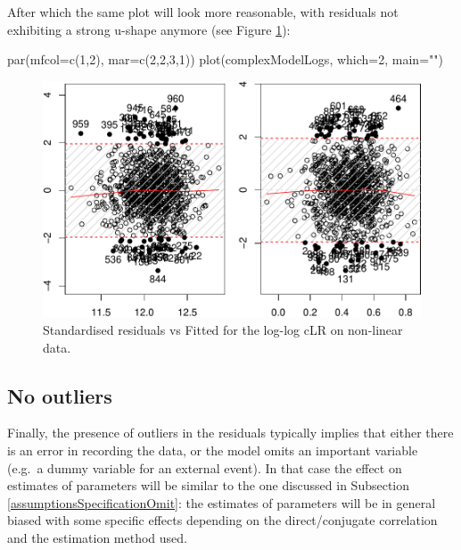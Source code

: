 \documentclass[
]{book}
\newenvironment{Shaded}{\begin{snugshade}}{\end{snugshade}}
\newcommand{\AttributeTok}[1]{\textcolor[rgb]{0.77,0.63,0.00}{#1}}
\newcommand{\DecValTok}[1]{\textcolor[rgb]{0.00,0.00,0.81}{#1}}
\newcommand{\FunctionTok}[1]{\textcolor[rgb]{0.00,0.00,0.00}{#1}}
\newcommand{\NormalTok}[1]{#1}
\newcommand{\StringTok}[1]{\textcolor[rgb]{0.31,0.60,0.02}{#1}}
\begin{document}
After which the same plot will look more reasonable, with residuals not exhibiting a strong u-shape anymore (see Figure \ref{fig:nonlinearStdResid}):

\begin{Shaded}
\begin{Highlighting}[]
\FunctionTok{par}\NormalTok{(}\AttributeTok{mfcol=}\FunctionTok{c}\NormalTok{(}\DecValTok{1}\NormalTok{,}\DecValTok{2}\NormalTok{), }\AttributeTok{mar=}\FunctionTok{c}\NormalTok{(}\DecValTok{2}\NormalTok{,}\DecValTok{2}\NormalTok{,}\DecValTok{3}\NormalTok{,}\DecValTok{1}\NormalTok{))}
\FunctionTok{plot}\NormalTok{(complexModelLogs, }\AttributeTok{which=}\DecValTok{2}\NormalTok{, }\AttributeTok{main=}\StringTok{""}\NormalTok{)}
\end{Highlighting}
\end{Shaded}

\begin{figure}
\centering
\includegraphics{Svetunkov---Svetunkov---Complex-Valued-Econometrics_files/figure-latex/nonlinearStdResid-1.pdf}
\caption{\label{fig:nonlinearStdResid}Standardised residuals vs Fitted for the log-log cLR on non-linear data.}
\end{figure}

\hypertarget{assumptionsSpecificationOutlier}{%
\subsection{No outliers}\label{assumptionsSpecificationOutlier}}

Finally, the presence of outliers in the residuals typically implies that either there is an error in recording the data, or the model omits an important variable (e.g.~a dummy variable for an external event). In that case the effect on estimates of parameters will be similar to the one discussed in Subsection \ref{assumptionsSpecificationOmit}: the estimates of parameters will be in general biased with some specific effects depending on the direct/conjugate correlation and the estimation method used.
\end{document}
